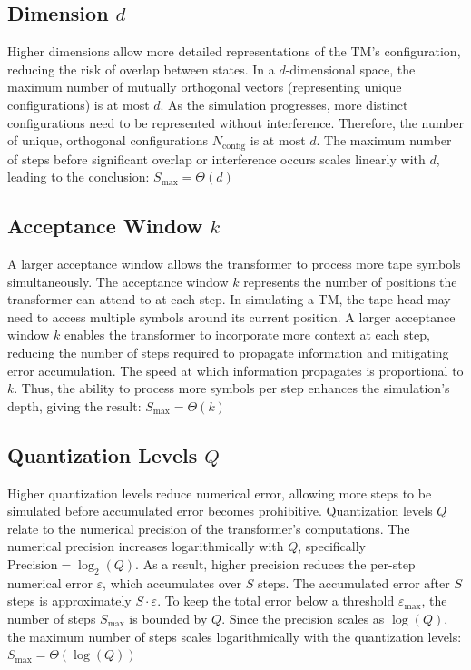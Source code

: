 \subsection{Dimension \( d \)}

Higher dimensions allow more detailed representations of the TM's configuration, reducing the risk of overlap between states.
 In a \( d \)-dimensional space, the maximum number of mutually orthogonal vectors (representing unique configurations) is at most \( d \). As the simulation progresses, more distinct configurations need to be represented without interference. Therefore, the number of unique, orthogonal configurations \( N_{\text{config}} \) is at most \( d \). The maximum number of steps before significant overlap or interference occurs scales linearly with \( d \), leading to the conclusion:
\(
S_{\text{max}} = \Theta(d)
\)

\subsection{Acceptance Window \( k \)}

A larger acceptance window allows the transformer to process more tape symbols simultaneously.
The acceptance window \( k \) represents the number of positions the transformer can attend to at each step. In simulating a TM, the tape head may need to access multiple symbols around its current position. A larger acceptance window \( k \) enables the transformer to incorporate more context at each step, reducing the number of steps required to propagate information and mitigating error accumulation. The speed at which information propagates is proportional to \( k \).
Thus, the ability to process more symbols per step enhances the simulation’s depth, giving the result:
\(
S_{\text{max}} = \Theta(k)
\)

\subsection{Quantization Levels \( Q \)}

Higher quantization levels reduce numerical error, allowing more steps to be simulated before accumulated error becomes prohibitive.
Quantization levels \( Q \) relate to the numerical precision of the transformer's computations. The numerical precision increases logarithmically with \( Q \), specifically \( \text{Precision} = \log_2(Q) \). As a result, higher precision reduces the per-step numerical error \( \varepsilon \), which accumulates over \( S \) steps. The accumulated error after \( S \) steps is approximately \( S \cdot \varepsilon \). To keep the total error below a threshold \( \varepsilon_{\text{max}} \), the number of steps \( S_{\text{max}} \) is bounded by \( Q \). Since the precision scales as \( \log(Q) \), the maximum number of steps scales logarithmically with the quantization levels:
\(
S_{\text{max}} = \Theta(\log(Q))
\)

